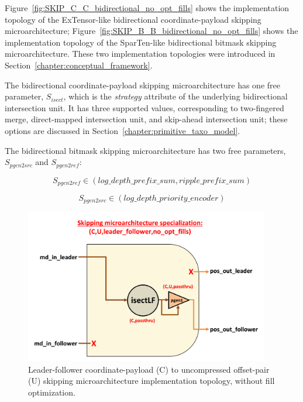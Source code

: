 Figure~\ref{fig:SKIP_C_C_bidirectional_no_opt_fills} shows the implementation topology of the ExTensor-like\cite{extensor} bidirectional coordinate-payload skipping microarchitecture; Figure~\ref{fig:SKIP_B_B_bidirectional_no_opt_fills} shows the implementation topology of the SparTen-like\cite{sparten} bidirectional bitmask skipping microarchitecture. These two implementation topologies were introduced in Section~\ref{chapter:conceptual_framework}.

The bidirectional coordinate-payload skipping microarchitecture has one free parameter, $S_{isect}$, which is the \textit{strategy} attribute of the underlying bidirectional intersection unit. It has three supported values, corresponding to two-fingered merge, direct-mapped intersection unit, and skip-ahead intersection unit; these options are discussed in Section~\ref{chapter:primitive_taxo_model}.

The bidirectional bitmask skipping microarchitecture has two free parameters, $S_{pgen2src}$ and $S_{pgen2ref}$:

\[ S_{pgen2ref} \in (log\_depth\_prefix\_sum , ripple\_prefix\_sum) \]

\[ S_{pgen2src} \in (log\_depth\_priority\_encoder) \]

\begin{figure}[H]
    \centering
    \includegraphics[width=0.95\textwidth]{figures/SKIP_C_U_leader_follower_no_opt_fills.png}
    \caption{Leader-follower coordinate-payload (C) to uncompressed offset-pair (U) skipping microarchitecture implementation topology, without fill optimization.}
    \label{fig:SKIP_C_U_leader_follower_no_opt_fills}
\end{figure}

